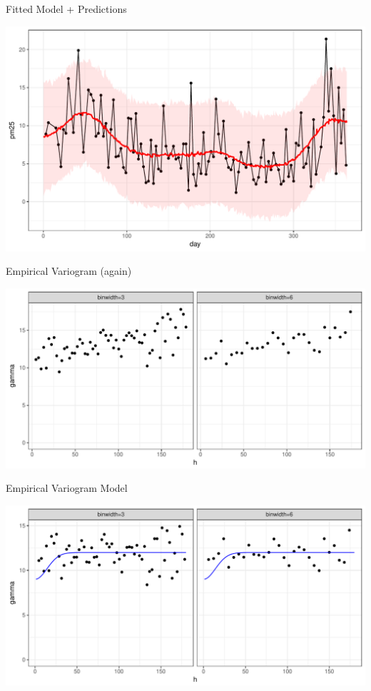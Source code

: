 \documentclass[11pt,ignorenonframetext,]{beamer}
\begin{document}
\begin{frame}{Fitted Model + Predictions}

\includegraphics{Lec13_files/figure-beamer/unnamed-chunk-22-1.pdf}

\end{frame}

\begin{frame}{Empirical Variogram (again)}

\includegraphics{Lec13_files/figure-beamer/unnamed-chunk-23-1.pdf}

\end{frame}

\begin{frame}{Empirical Variogram Model}

\includegraphics{Lec13_files/figure-beamer/unnamed-chunk-24-1.pdf}

\end{frame}
\end{document}
